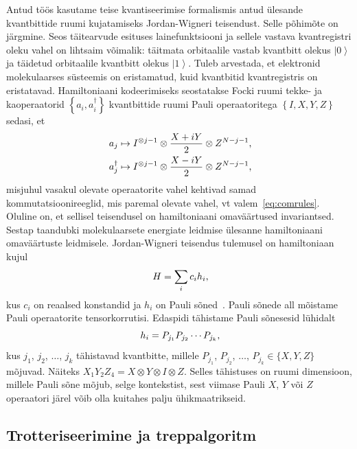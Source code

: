 \documentclass[12pt]{report}
\def\cparen#1{\left\{#1\right\}}
\def\ket#1{\left|#1\right>}
\begin{document}
Antud töös kasutame teise kvantiseerimise formalismis antud ülesande kvantbittide ruumi kujatamiseks Jordan-Wigneri teisendust.
Selle põhimõte on järgmine.
Seos täitearvude esituses lainefunktsiooni ja sellele vastava kvantregistri oleku vahel on lihtsaim võimalik: täitmata orbitaalile vastab kvantbitt olekus \(\ket{0}\) ja täidetud orbitaalile kvantbitt olekus \(\ket{1}\).
Tuleb arvestada, et elektronid molekulaarses süsteemis on eristamatud, kuid kvantbitid kvantregistris on eristatavad.
Hamiltoniaani kodeerimiseks seostatakse Focki ruumi tekke- ja kaoperaatorid \(\cparen{a_i, a_i^\dagger}\) kvantbittide ruumi Pauli operaatoritega \(\cparen{I, X, Y, Z}\) sedasi, et
\begin{align}
    a_j &\mapsto I^{\otimes j-1} \otimes \frac{X+iY}{2} \otimes Z^{N-j-1} \rlap{,} \\
    a_j^\dagger &\mapsto I^{\otimes j-1} \otimes \frac{X-iY}{2} \otimes Z^{N-j-1} \rlap{,}
\end{align}
misjuhul vasakul olevate operaatorite vahel kehtivad samad kommutatsioonireeglid, mis paremal olevate vahel, vt valem~\eqref{eq:comrules}.
Oluline on, et sellisel teisendusel on hamiltoniaani omaväärtused invariantsed.
Sestap taandubki molekulaarsete energiate leidmise ülesanne hamiltoniaani omaväärtuste leidmisele.
Jordan-Wigneri teisendus tulemusel on hamiltoniaan kujul
\begin{align}\label{eq:paulisum}
    H = \sum_i c_i h_i \rlap{,}
\end{align}
kus \(c_i\) on reaalsed konstandid ja \(h_i\) on Pauli sõned~\cite{whitfield+etal2011, mcardle+etal}.
Pauli sõnede all mõistame Pauli operaatorite tensorkorrutisi.
Edaspidi tähistame Pauli sõnesesid lühidalt
\begin{equation} h_i=P_{j_1}P_{j_2}\cdots P_{j_k} \rlap{,}\end{equation}
kus \(j_1\), \(j_2\), $\ldots$, \(j_k\) tähistavad kvantbitte, millele \(P_{j_1}\), \(P_{j_2}\), \(\ldots\), \(P_{j_k}\in\{X,Y,Z\}\) mõjuvad.
Näiteks \(X_1Y_2Z_4=X\otimes Y\otimes I\otimes Z.\)
Selles tähistuses on ruumi dimensioon, millele Pauli sõne mõjub, selge kontekstist, sest viimase Pauli \(X\), \(Y\) või \(Z\) operaatori järel võib olla kuitahes palju ühikmaatrikseid.

\subsection{Trotteriseerimine ja treppalgoritm}\label{sec:qcirc}
\end{document}
